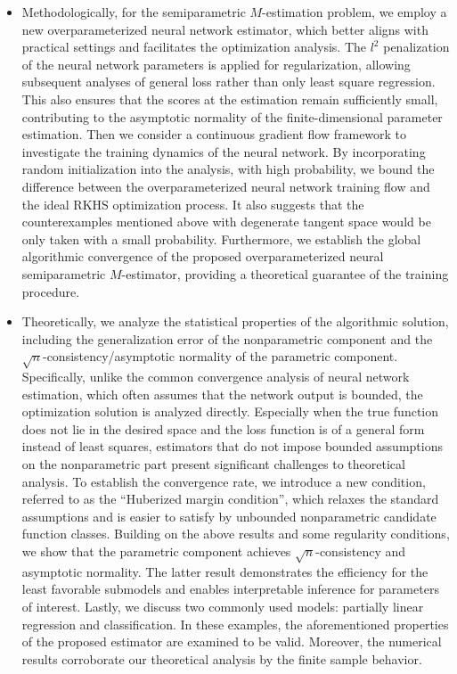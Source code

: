 \begin{itemize}
\item 
Methodologically, for the semiparametric $M$-estimation problem, we employ a new overparameterized neural network estimator, which better aligns with practical settings and facilitates the optimization analysis. The \( l^2 \) penalization of the neural network parameters is applied for regularization, allowing subsequent analyses of general loss rather than only least square regression. This also ensures that the scores at the estimation remain sufficiently small, contributing to the asymptotic normality of the finite-dimensional parameter estimation. 
Then we consider a continuous gradient flow framework to investigate the training dynamics of the neural network. By incorporating random initialization into the analysis, with high probability, we bound the difference between the overparameterized neural network training flow and the ideal RKHS optimization process. 
It also suggests that the counterexamples mentioned above with degenerate tangent space would be only taken with a small probability. 
Furthermore, we establish the global algorithmic convergence of the proposed overparameterized neural semiparametric $M$-estimator, providing a theoretical guarantee of the training procedure.




\item  
Theoretically, we analyze the statistical properties of the algorithmic solution, including the generalization error of the nonparametric component and the $\sqrt{n}$-consistency/asymptotic normality of the parametric component.
Specifically, unlike the common convergence analysis of neural network estimation, which often assumes that the network output is bounded, 
the optimization solution is analyzed directly.
Especially when the true function does not lie in the desired space and the loss function is of a general form instead of least squares, estimators that do not impose bounded assumptions on the nonparametric part present significant challenges to theoretical analysis. To establish the convergence rate, we introduce a new condition, referred to as the ``Huberized margin condition'', which relaxes the standard assumptions and is easier to satisfy by unbounded nonparametric candidate function classes. 
Building on the above results and some regularity conditions, we show that the parametric component achieves $\sqrt{n}$-consistency and asymptotic normality. 
The latter result demonstrates the efficiency for the least favorable submodels and enables interpretable inference for parameters of interest. 
Lastly, we discuss two commonly used models: partially linear regression and classification. In these examples, the aforementioned properties of the proposed estimator are examined to be valid. 
Moreover, the numerical results corroborate our theoretical analysis by the finite sample behavior.


\end{itemize}





